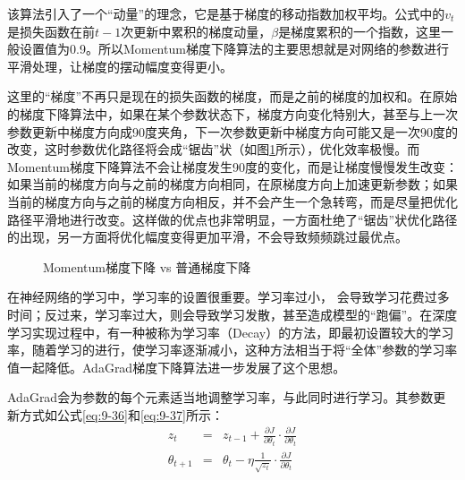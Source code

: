 \parinterval  该算法引入了一个“动量”的理念，它是基于梯度的移动指数加权平均。公式中的$ {v}_t $是损失函数在前$ t-1 $次更新中累积的梯度动量，$ \beta $是梯度累积的一个指数，这里一般设置值为0.9。所以Momentum梯度下降算法的主要思想就是对网络的参数进行平滑处理，让梯度的摆动幅度变得更小。

\parinterval  这里的“梯度”不再只是现在的损失函数的梯度，而是之前的梯度的加权和。在原始的梯度下降算法中，如果在某个参数状态下，梯度方向变化特别大，甚至与上一次参数更新中梯度方向成90度夹角，下一次参数更新中梯度方向可能又是一次90度的改变，这时参数优化路径将会成“锯齿”状（如图\ref{fig:9-46}所示），优化效率极慢。而Momentum梯度下降算法不会让梯度发生90度的变化，而是让梯度慢慢发生改变：如果当前的梯度方向与之前的梯度方向相同，在原梯度方向上加速更新参数；如果当前的梯度方向与之前的梯度方向相反，并不会产生一个急转弯，而是尽量把优化路径平滑地进行改变。这样做的优点也非常明显，一方面杜绝了“锯齿”状优化路径的出现，另一方面将优化幅度变得更加平滑，不会导致频频跳过最优点。

\begin{figure}[htp]
\centering

\caption{Momentum梯度下降 vs 普通梯度下降}
\label{fig:9-46}
\end{figure}


%

\vspace{0.5em}
\vspace{0.5em}

\parinterval  在神经网络的学习中，学习率的设置很重要。学习率过小， 会导致学习花费过多时间；反过来，学习率过大，则会导致学习发散，甚至造成模型的“跑偏”。在深度学习实现过程中，有一种被称为学习率{\small{}}（Decay）的方法，即最初设置较大的学习率，随着学习的进行，使学习率逐渐减小，这种方法相当于将“全体”参数的学习率值一起降低。AdaGrad梯度下降算法进一步发展了这个思想。

\parinterval  AdaGrad会为参数的每个元素适当地调整学习率，与此同时进行学习。其参数更新方式如公式\eqref{eq:9-36}和\eqref{eq:9-37}所示：
\begin{eqnarray}
z_t&=&z_{t-1}+\frac{\partial J}{\partial {\theta}_t} \cdot \frac{\partial J}{\partial {\theta}_t}
\label{eq:9-36}\\
{\theta}_{t+1}&=&{\theta}_t-\eta \frac{1}{\sqrt{z_t}}\cdot \frac{\partial J}{\partial {\theta}_t}
\label{eq:9-37}
\end{eqnarray}

